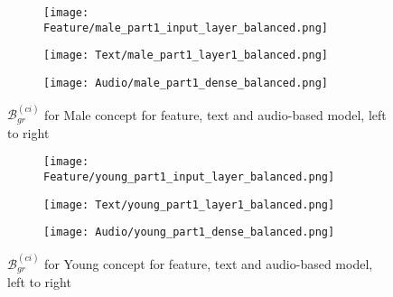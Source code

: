 \begin{figure}[H]
    \centering
    \begin{subfigure}{0.32\textwidth}
        \centering
        \texttt{[image: Feature/male\_part1\_input\_layer\_balanced.png]}
    \end{subfigure}
    \hfill
    \begin{subfigure}{0.32\textwidth}
        \centering
        \texttt{[image: Text/male\_part1\_layer1\_balanced.png]}
    \end{subfigure}
    \hfill
    \begin{subfigure}{0.32\textwidth}
        \centering
        \texttt{[image: Audio/male\_part1\_dense\_balanced.png]}
    \end{subfigure}
    \caption{$\mathcal{B}^{(ci)}_{gr}$ for Male concept for feature, text and audio-based model, left to right}
    \label{fig:grad_male_balanced}
\end{figure}

\begin{figure}[H]
    \centering
    \begin{subfigure}{0.32\textwidth}
        \centering
        \texttt{[image: Feature/young\_part1\_input\_layer\_balanced.png]}
    \end{subfigure}
    \hfill
    \begin{subfigure}{0.32\textwidth}
        \centering
        \texttt{[image: Text/young\_part1\_layer1\_balanced.png]}
    \end{subfigure}
    \hfill
    \begin{subfigure}{0.32\textwidth}
        \centering
        \texttt{[image: Audio/young\_part1\_dense\_balanced.png]}
    \end{subfigure}
    \caption{$\mathcal{B}^{(ci)}_{gr}$ for Young concept for feature, text and audio-based model, left to right}
    \label{fig:grad_young_balanced}
\end{figure}

